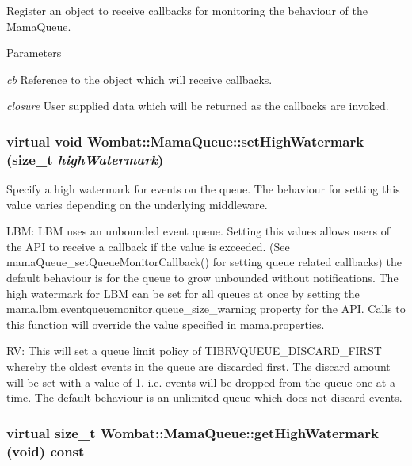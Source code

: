 Register an object to receive callbacks for monitoring the behaviour of the \hyperlink{classWombat_1_1MamaQueue}{MamaQueue}. 
\begin{DoxyParams}{Parameters}
\item[{\em cb}]Reference to the object which will receive callbacks. \item[{\em closure}]User supplied data which will be returned as the callbacks are invoked. \end{DoxyParams}
\hypertarget{classWombat_1_1MamaQueue_ab1c8c7a72c3acd9aac71bc9baebdb6ff}{
\subsubsection[{setHighWatermark}]{\setlength{\rightskip}{0pt plus 5cm}virtual void Wombat::MamaQueue::setHighWatermark (size\_\-t {\em highWatermark})}}
\label{classWombat_1_1MamaQueue_ab1c8c7a72c3acd9aac71bc9baebdb6ff}


Specify a high watermark for events on the queue. The behaviour for setting this value varies depending on the underlying middleware.

LBM: LBM uses an unbounded event queue. Setting this values allows users of the API to receive a callback if the value is exceeded. (See mamaQueue\_\-setQueueMonitorCallback() for setting queue related callbacks) the default behaviour is for the queue to grow unbounded without notifications. The high watermark for LBM can be set for all queues at once by setting the mama.lbm.eventqueuemonitor.queue\_\-size\_\-warning property for the API. Calls to this function will override the value specified in mama.properties.

RV: This will set a queue limit policy of TIBRVQUEUE\_\-DISCARD\_\-FIRST whereby the oldest events in the queue are discarded first. The discard amount will be set with a value of 1. i.e. events will be dropped from the queue one at a time. The default behaviour is an unlimited queue which does not discard events. \hypertarget{classWombat_1_1MamaQueue_a367350a4f52003325fbc72031094f3b5}{
\subsubsection[{getHighWatermark}]{\setlength{\rightskip}{0pt plus 5cm}virtual size\_\-t Wombat::MamaQueue::getHighWatermark (void) const}}
\label{classWombat_1_1MamaQueue_a367350a4f52003325fbc72031094f3b5}


